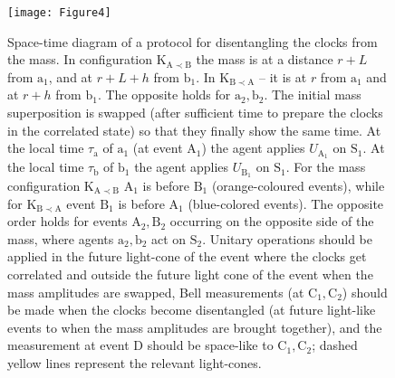 \documentclass[a4paper,11pt]{article}
\begin{document}
%
\begin{figure}[h!]
\texttt{[image: Figure4]}
\caption{Space-time diagram of a protocol for disentangling the clocks from the mass.
In configuration $\mathrm{K_{A\prec B}}$ the mass is at a distance  $r+L$ from $\mathrm a_1$,
and at $r+L+h$ from $\mathrm b_1$. In $\mathrm{K_{B\prec A}}$ -- it is at $r$ from $\mathrm a_1$ and at $r+h$ from $\mathrm b_1$.
The opposite holds for $\mathrm{a_2, b_2}$. The initial mass superposition is swapped (after sufficient time to prepare the clocks in the correlated state) so that they finally show the same time. At the local time $\tau_\mathrm{a}$ of $\mathrm a_1$ (at event $\mathrm A_1$) the agent applies $U_\mathrm{A_1}$  on $\mathrm S_1$. At the local time $\tau_\mathrm{b}$ of $\mathrm b_1$ the agent applies $U_\mathrm{B_1}$ on $\mathrm S_1$.  For the mass configuration  $\mathrm{K_{A\prec B}}$  $\mathrm A_1$ is before $\mathrm B_1$ (orange-coloured events), while for  $\mathrm{K_{B\prec A}}$ event $\mathrm B_1$ is before $\mathrm A_1$ (blue-colored events). The opposite order holds for events $\mathrm{A_2, B_2}$ occurring on the opposite side of the mass, where agents $\mathrm{a_2, b_2}$ act on $\mathrm S_2$. Unitary operations should be applied {in the future light-cone of the event where the clocks get correlated and outside the future light cone of the event when the mass amplitudes are swapped}, Bell measurements (at $\mathrm{C_1, C_2}$) should be made when the clocks become disentangled {(at future light-like events to when the mass amplitudes are brought together)}, and the measurement at event $\mathrm D$ should be space-like to $\mathrm{C_1, C_2}$;  dashed yellow lines represent the relevant light-cones.\hspace*{\fill}}\label{disentangle}
\end{figure}
\end{document}
